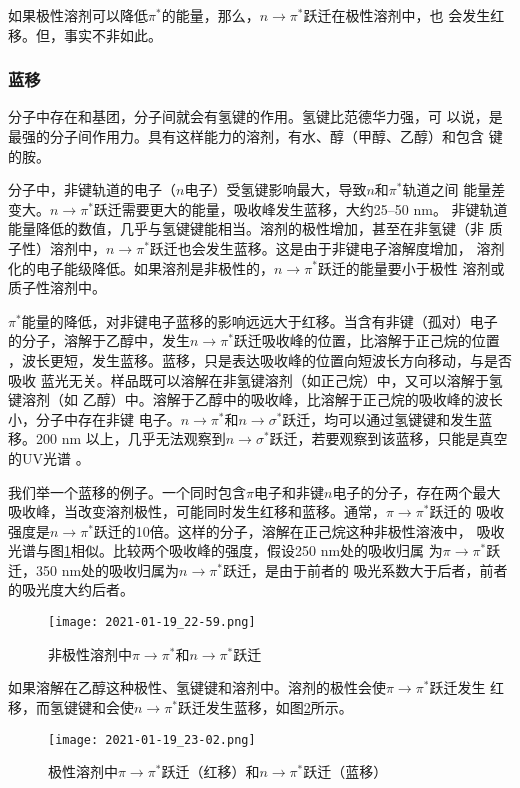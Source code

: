 如果极性溶剂可以降低$\pi^\ast$的能量，那么，$n\to\pi^\ast$跃迁在极性溶剂中，也
会发生红移。但，事实不非如此。
\subsubsection{蓝移}
分子中存在和基团，分子间就会有氢键的作用。氢键比范德华力强，可
以说，是最强的分子间作用力。具有这样能力的溶剂，有水、醇（甲醇、乙醇）和包含
键的胺。

分子中，非键轨道的电子（$n$电子）受氢键影响最大，导致$n$和$\pi^\ast$轨道之间
能量差变大。$n\to\pi^\ast$跃迁需要更大的能量，吸收峰发生蓝移，大约25--50 nm。
非键轨道能量降低的数值，几乎与氢键键能相当。溶剂的极性增加，甚至在非氢键（非
质子性）溶剂中，$n\to\pi^\ast$跃迁也会发生蓝移。这是由于非键电子溶解度增加，
溶剂化的电子能级降低。如果溶剂是非极性的，$n\to\pi^\ast$跃迁的能量要小于极性
溶剂或质子性溶剂中。

$\pi^\ast$能量的降低，对非键电子蓝移的影响远远大于红移。当含有非键（孤对）电子
的分子，溶解于乙醇中，发生$n\to\pi^\ast$跃迁吸收峰的位置，比溶解于正己烷的位置
，波长更短，发生蓝移。蓝移，只是表达吸收峰的位置向短波长方向移动，与是否吸收
蓝光无关。样品既可以溶解在非氢键溶剂（如正己烷）中，又可以溶解于氢键溶剂（如
乙醇）中。溶解于乙醇中的吸收峰，比溶解于正己烷的吸收峰的波长小，分子中存在非键
电子。$n\to\pi^\ast$和$n\to\sigma^\ast$跃迁，均可以通过氢键键和发生蓝移。200 nm
以上，几乎无法观察到$n\to\sigma^\ast$跃迁，若要观察到该蓝移，只能是真空的UV光谱
。

我们举一个蓝移的例子。一个同时包含$\pi$电子和非键$n$电子的分子，存在两个最大
吸收峰，当改变溶剂极性，可能同时发生红移和蓝移。通常，$\pi\to\pi^\ast$跃迁的
吸收强度是$n\to\pi^\ast$跃迁的10倍。这样的分子，溶解在正己烷这种非极性溶液中，
吸收光谱与图\ref{fig:5.40}相似。比较两个吸收峰的强度，假设250 nm处的吸收归属
为$\pi\to\pi^\ast$跃迁，350 nm处的吸收归属为$n\to\pi^\ast$跃迁，是由于前者的
吸光系数大于后者，前者的吸光度大约后者。
\begin{figure}[htpb]
    \centering
    \texttt{[image: 2021-01-19\_22-59.png]}
    \caption{非极性溶剂中$\pi\to\pi^\ast$和$n\to\pi^\ast$跃迁}
    \label{fig:5.40}
\end{figure}

如果溶解在乙醇这种极性、氢键键和溶剂中。溶剂的极性会使$\pi\to\pi^\ast$跃迁发生
红移，而氢键键和会使$n\to\pi^\ast$跃迁发生蓝移，如图\ref{fig:5.41}所示。
\begin{figure}[htpb]
    \centering
    \texttt{[image: 2021-01-19\_23-02.png]}
    \caption{极性溶剂中$\pi\to\pi^\ast$跃迁（红移）和$n\to\pi^\ast$跃迁（蓝移）}
    \label{fig:5.41}
\end{figure}

